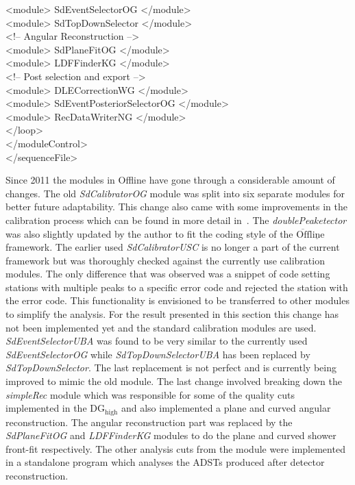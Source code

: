     \null\qquad \quad   <module> SdEventSelectorOG </module>\\
    \null\qquad \quad   <module> SdTopDownSelector </module>\\
    \null\qquad \quad  <!-- Angular Reconstruction -->\\
    \null\qquad \quad   <module> SdPlaneFitOG </module>\\
    \null\qquad \quad   <module> LDFFinderKG </module>\\
    \null\qquad \quad  <!-- Post selection and export -->\\
    \null\qquad \quad   <module> DLECorrectionWG </module>\\
    \null\qquad \quad   <module> SdEventPosteriorSelectorOG </module>\\
    \null\qquad \quad   <module> RecDataWriterNG </module>\\
  \null \qquad  </loop>\\
  \null \quad  </moduleControl>\\
   </sequenceFile>\\
\endgroup

Since 2011 the modules in Offline have gone through a considerable amount of changes. The old \textit{SdCalibratorOG} module was split into six separate modules for better future adaptability. This change also came with some improvements in the calibration process which can be found in more detail in~\cite{Baseline_update}. The \textit{doublePeaketector} was also slightly updated by the author to fit the coding style of the $\mathrm{\overline{Off}\underline{line}}$ framework. The earlier used \textit{SdCalibratorUSC} is no longer a part of the current framework but was thoroughly checked against the currently use calibration modules. The only difference that was observed was a snippet of code setting stations with multiple peaks to a specific error code and rejected the station with the error code. This functionality is envisioned to be transferred to other modules to simplify the analysis. For the result presented in this section this change has not been implemented yet and the standard calibration modules are used. \textit{SdEventSelectorUBA} was found to be very similar to the currently used \textit{SdEventSelectorOG} while \textit{SdTopDownSelectorUBA} has been replaced by \textit{SdTopDownSelector}. The last replacement is not perfect and is currently being improved to mimic the old module. The last change involved breaking down the \textit{simpleRec} module which was responsible for some of the quality cuts implemented in the DG$\mathrm{_{high}}$ and also implemented a plane and curved angular reconstruction. The angular reconstruction part was replaced by the \textit{SdPlaneFitOG} and \textit{LDFFinderKG} modules to do the plane and curved shower front-fit respectively. The other analysis cuts from the module were implemented in a standalone program which analyses the ADSTs produced after detector reconstruction. 


